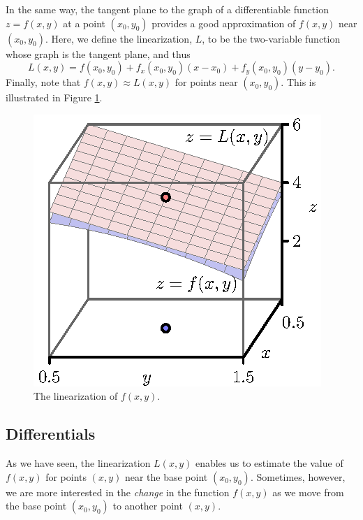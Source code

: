 In the same way, the tangent plane to the graph of a differentiable function $z = f(x,y)$ at a point
$(x_0,y_0)$ provides a good approximation of $f(x,y)$ near $(x_0,
y_0)$.  Here, we define the linearization, $L$, to be the two-variable function whose
graph is the tangent plane, and thus
$$
L(x,y) = f(x_0,y_0) + f_x(x_0,y_0)(x-x_0) +
f_y(x_0,y_0)(y-y_0).
$$
Finally, note that $f(x,y)\approx L(x,y)$ for points near $(x_0,
y_0)$. This is illustrated in Figure \ref{F:10.4.tangent.9}.

\begin{figure}[ht]
  \begin{center}
    \includegraphics{figures/fig_10_4_tangent_9.eps}
  \end{center}
  \caption{The linearization of $f(x,y)$.}
  \label{F:10.4.tangent.9}
\end{figure}



\subsection*{Differentials}

As we have seen, the linearization $L(x,y)$ enables us to estimate the value of $f(x,y)$ for points $(x,y)$ near the base point
$(x_0, y_0)$. 
Sometimes, however, we are more interested in the {\em change} in the
function $f(x,y)$ as we move from the base point $(x_0,y_0)$ to another
point $(x,y)$.  

